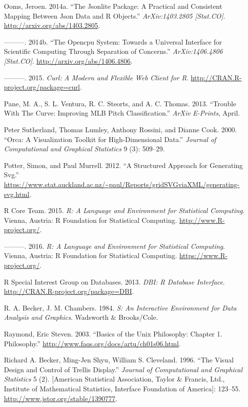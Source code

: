 \documentclass[12pt,]{isuthesis}
\begin{document}
\hypertarget{ref-jsonlite}{}
Ooms, Jeroen. 2014a. ``The Jsonlite Package: A Practical and Consistent
Mapping Between Json Data and R Objects.'' \emph{ArXiv:1403.2805
{[}Stat.CO{]}}. \url{http://arxiv.org/abs/1403.2805}.

\hypertarget{ref-opencpu}{}
---------. 2014b. ``The Opencpu System: Towards a Universal Interface
for Scientific Computing Through Separation of Concerns.''
\emph{ArXiv:1406.4806 {[}Stat.CO{]}}.
\url{http://arxiv.org/abs/1406.4806}.

\hypertarget{ref-curl}{}
---------. 2015. \emph{Curl: A Modern and Flexible Web Client for R}.
\url{http://CRAN.R-project.org/package=curl}.

\hypertarget{ref-curve}{}
Pane, M. A., S. L. Ventura, R. C. Steorts, and A. C. Thomas. 2013.
``Trouble With The Curve: Improving MLB Pitch Classification.''
\emph{ArXiv E-Prints}, April.

\hypertarget{ref-orca}{}
Peter Sutherland, Thomas Lumley, Anthony Rossini, and Dianne Cook. 2000.
``Orca: A Visualization Toolkit for High-Dimensional Data.''
\emph{Journal of Computational and Graphical Statistics} 9 (3): 509--29.

\hypertarget{ref-gridSVGreport}{}
Potter, Simon, and Paul Murrell. 2012. ``A Structured Approach for
Generating Svg.''
\url{https://www.stat.auckland.ac.nz/~paul/Reports/gridSVGviaXML/generating-svg.html}.

\hypertarget{ref-RCore}{}
R Core Team. 2015. \emph{R: A Language and Environment for Statistical
Computing}. Vienna, Austria: R Foundation for Statistical Computing.
\url{http://www.R-project.org/}.

\hypertarget{ref-base}{}
---------. 2016. \emph{R: A Language and Environment for Statistical
Computing}. Vienna, Austria: R Foundation for Statistical Computing.
\url{https://www.R-project.org/}.

\hypertarget{ref-DBI}{}
R Special Interest Group on Databases. 2013. \emph{DBI: R Database
Interface}. \url{http://CRAN.R-project.org/package=DBI}.

\hypertarget{ref-S:1984}{}
R. A. Becker, J. M. Chambers. 1984. \emph{S: An Interactive Environment
for Data Analysis and Graphics}. Wadsworth \& Brooks/Cole.

\hypertarget{ref-unix-philosophy}{}
Raymond, Eric Steven. 2003. ``Basics of the Unix Philosophy: Chapter 1.
Philosophy.'' \url{http://www.faqs.org/docs/artu/ch01s06.html}.

\hypertarget{ref-trellis}{}
Richard A. Becker, Ming-Jen Shyu, William S. Cleveland. 1996. ``The
Visual Design and Control of Trellis Display.'' \emph{Journal of
Computational and Graphical Statistics} 5 (2). {[}American Statistical
Association, Taylor \& Francis, Ltd., Institute of Mathematical
Statistics, Interface Foundation of America{]}: 123--55.
\url{http://www.jstor.org/stable/1390777}.
\end{document}
